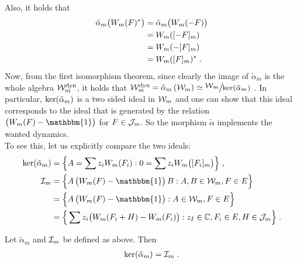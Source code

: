 	Also, it holds that
	\begin{align}
	\tilde{\alpha}_m\big( W_m(F) ^* \big) 
	&=\tilde{\alpha}_m\big( W_m(-F) \big) \notag\\
	&= W_m([-F]_m)  \notag\\
	&=  W_m(-[F]_m)  \notag\\
	 &= W_m([F]_m)^* \;.
	\end{align}
	Now, from the first isomorphism theorem, since clearly the image of $\tilde{\alpha}_m$ is the whole algebra $\mathcal{W}^\text{dyn}_m$, it holds that $\Wmdyn = \tilde{\alpha}_m\left( \Wm \right) \simeq {\Quotientscale{\Wm}{\Ker{\tilde{\alpha}_m}}}$ .
	In particular, $\mathrm{ker}{}(\tilde{\alpha}_m)$ is a two sided ideal in $\mathcal{W}_m$ and one can show that this ideal corresponds to the ideal that is generated by the relation $\big( W_m(F) -\mathbbm{1} \big)$ for $F \in \mathcal{J}_m$. So the morphism $\tilde{\alpha}$ implements the wanted dynamics. \\[4mm]  
	To see this, let us explicitly compare the two ideals:
	\begin{align}
		\Ker{\tilde{\alpha}_m} &= \Big\{A = \sum z_i W_m(F_i) : 0 = \sum z_i W_m\big([F_i]_m\big)\Big\}  \formspace,\\
		\IM &=  \Big\{A\, \big(W_m(F) - \mathbbm{1}\big)\,  B  : A, B  \in \Wm, F \in E \Big\} \notag  \\
									& = \Big\{A\, \big(W_m(F) - \mathbbm{1}\big)  : A  \in \Wm, F \in E \Big\} \notag\\
									& =  \Big\{\sum z_i  \big( W_m(F_i + H ) - W_m(F_i)\big) :  z_I \in \IC, F_i \in E , H \in \JM\Big\} \formspace.
	\end{align}
	\begin{lemma}
		Let $\tilde{\alpha}_m$ and $\mathcal{I}_m$ be defined as above. Then
		\begin{align}
		 \mathrm{ker}{}(\tilde{\alpha}_m) = \mathcal{I}_m \;.
		\end{align}
	\end{lemma}
